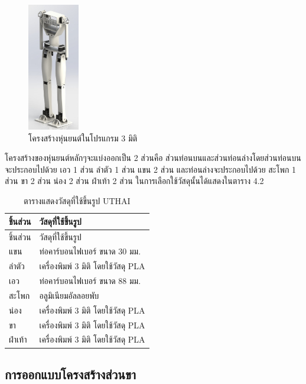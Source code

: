 \begin{figure}[h!]
    \centering
    \includegraphics[width=0.2\textwidth]{chapter4/images/UTHAI_ver_1.jpg}
    \caption{โครงสร้างหุ่นยนต์ในโปรแกรม 3 มิติ}
    \label{fig:UTHAI_ver_1}
\end{figure}

โครงสร้างของหุ่นยนต์หลักๆจะแบ่งออกเป็น 2 ส่วนคือ ส่วนท่อนบนและส่วนท่อนล่างโดยส่วนท่อนบนจะประกอบไปด้วย 
เอว 1 ส่วน ลำตัว 1 ส่วน แขน 2 ส่วน และท่อนล่างจะประกอบไปด้วย สะโพก 1 ส่วน ขา 2 ส่วน น่อง 2 ส่วน ฝ่าเท้า 2 ส่วน 
ในการเลือกใช้วัสดุนั้นได้แสดงในตาราง 4.2

\begin{table}[ht]
	\centering
	\begin{tabular}{| l | l |}
		\hline
		ชิ้นส่วน & วัสดุที่ใช้ขึ้นรูป \\
        \hline
        ชิ้นส่วน & วัสดุที่ใช้ขึ้นรูป \\
        แขน	& ท่อคาร์บอนไฟเบอร์ ขนาด 30 มม. \\
        ลำตัว & เครื่องพิมพ์ 3 มิติ โดยใช้วัสดุ PLA \\
        เอว	& ท่อคาร์บอนไฟเบอร์ ขนาด 88 มม. \\
        สะโพก & อลูมิเนียมอัลลอยพับ \\
        น่อง & เครื่องพิมพ์ 3 มิติ โดยใช้วัสดุ PLA \\
        ขา & เครื่องพิมพ์ 3 มิติ โดยใช้วัสดุ PLA \\
        ฝ่าเท้า	& เครื่องพิมพ์ 3 มิติ โดยใช้วัสดุ PLA \\
	    \hline
	\end{tabular}
	\caption{ตารางแสดงวัสดุที่ใช้ขึ้นรูป UTHAI}
	\label{tab:UTHAI_material}
\end{table}

\clearpage
\subsection{การออกแบบโครงสร้างส่วนขา}
